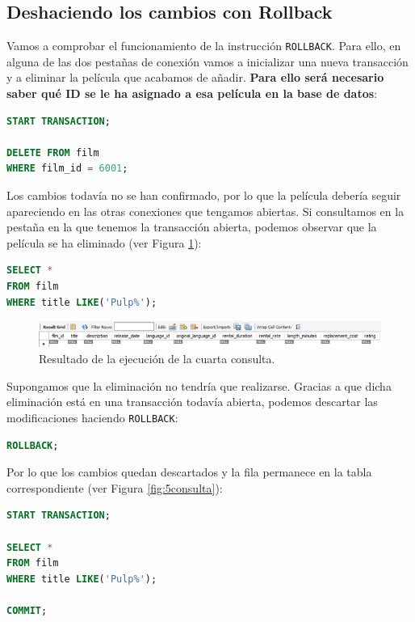 \documentclass[a4paper]{article}
\begin{document}
\subsection*{Deshaciendo los cambios con Rollback}

Vamos a comprobar el funcionamiento de la instrucción \texttt{ROLLBACK}. Para ello, en alguna de las dos pestañas de conexión vamos a inicializar una nueva transacción y a eliminar la película que acabamos de añadir. \textbf{Para ello será necesario saber qué ID se le ha asignado a esa película en la base de datos}:

\begin{lstlisting}[language=SQL]
START TRANSACTION;

DELETE FROM film 
WHERE film_id = 6001;
\end{lstlisting}

Los cambios todavía no se han confirmado, por lo que la película debería seguir apareciendo en las otras conexiones que tengamos abiertas. Si consultamos en la pestaña en la que tenemos la transacción abierta, podemos observar que la película se ha eliminado (ver Figura \ref{fig:4consulta}):

\begin{lstlisting}[language=SQL]
SELECT * 
FROM film
WHERE title LIKE('Pulp%');
\end{lstlisting}

\begin{figure}[ht]
    \centering
    \includegraphics[width=0.9\columnwidth]{figs/4consulta.png}
    \caption{Resultado de la ejecución de la cuarta consulta.}\label{fig:4consulta}
\end{figure}

Supongamos que la eliminación no tendría que realizarse. Gracias a que dicha eliminación está en una transacción todavía abierta, podemos descartar las modificaciones haciendo \texttt{ROLLBACK}:

\begin{lstlisting}[language=SQL]
ROLLBACK;
\end{lstlisting}

Por lo que los cambios quedan descartados y la fila permanece en la tabla correspondiente (ver Figura \ref{fig:5consulta}):

\begin{lstlisting}[language=SQL]
START TRANSACTION;

SELECT * 
FROM film
WHERE title LIKE('Pulp%');

COMMIT;
\end{lstlisting}
\end{document}
